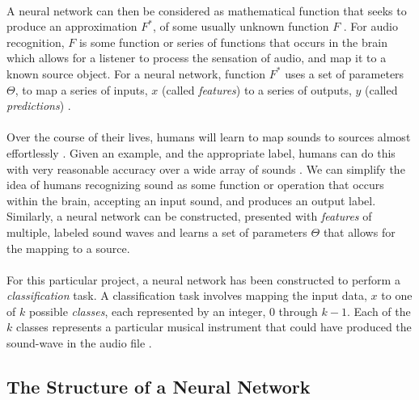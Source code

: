 \documentclass[12pt,letterpaper]{article}
\begin{document}
\paragraph*{}A neural network can then be considered as mathematical function that seeks to produce an approximation $F^*$, of some usually unknown function $F$ . For audio recognition, $F$ is some function or series of functions that occurs in the brain which allows for a listener to process the sensation of audio, and map it to a known source object. For a neural network, function $F^*$ uses a set of parameters $\Theta$, to map a series of inputs, $x$ (called \textit{features}) to a series of outputs, $y$ (called \textit{predictions}) \cite{Goodfellow,James,Virtanen}. 

\paragraph*{}Over the course of their lives, humans will learn to map sounds to sources almost effortlessly \cite{Virtanen}. Given an example, and the appropriate label, humans can do this with very reasonable accuracy over a wide array of sounds \cite{Olson,White}. We can simplify the idea of humans recognizing sound as some function or operation that occurs within the brain, accepting an input sound, and produces an output label. Similarly, a neural network can be constructed, presented with \textit{features} of multiple, labeled sound waves and learns a set of parameters $\Theta$ that allows for the mapping to a source.

\paragraph*{}For this particular project, a neural network has been constructed to perform a \textit{classification} task. A classification task involves mapping the input data, $x$ to one of $k$ possible \textit{classes}, each represented by an integer, $0$ through $k-1$. Each of the $k$ classes represents a particular musical instrument that could have produced the sound-wave in the audio file \cite{Goodfellow,Loy,Virtanen}. 


\subsection{The Structure of a Neural Network}
\label{subsec-NetworkStructure}
\end{document}
